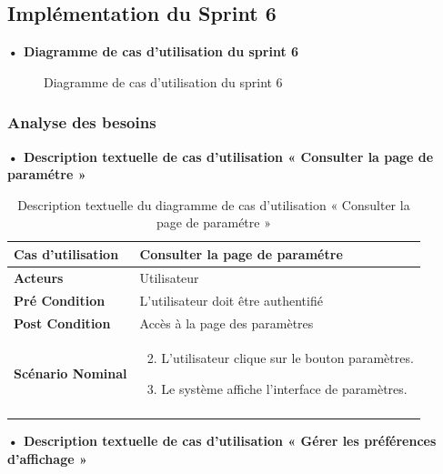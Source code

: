\subsection{Implémentation du Sprint 6}
\textbf{•	Diagramme de cas d'utilisation du sprint 6}

\begin{figure}[H]
  \centering
  \caption{Diagramme de cas d'utilisation du sprint 6}
  \label{fig:UseCaseDiagramSp61}
\end{figure}


\subsubsection{Analyse des besoins}

\textbf{•	Description textuelle de cas d'utilisation « Consulter la page de paramétre  »}

\begin{longtable}{|p{5cm}|p{10cm}|}
\hline
\textbf{Cas d'utilisation}&Consulter la page de paramétre\\
\hline
\textbf{Acteurs}&Utilisateur\\
\hline
\textbf{Pré Condition}&L'utilisateur doit être authentifié\\
\hline
\textbf{Post Condition}&Accès à la page des paramètres\\
\hline
\textbf{Scénario Nominal}&
\vspace{-\baselineskip}
\begin{enumerate}
  \setcounter{enumi}{1}
    \item L'utilisateur clique sur le bouton paramètres.
    \item Le système affiche l'interface de paramètres.
\end{enumerate}\\
\hline
\caption{Description textuelle du diagramme de cas d'utilisation « Consulter la page de paramétre »}
\label{tab:use_case_consult_settings_page}
\end{longtable}


\textbf{•	Description textuelle de cas d'utilisation « Gérer les préférences d'affichage   »}

